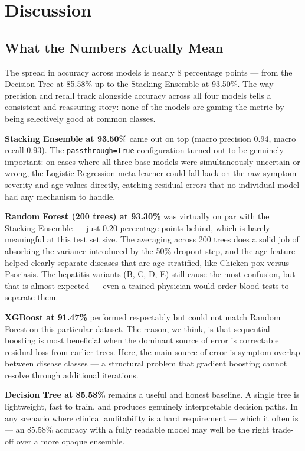 \documentclass[12pt,a4paper]{article}
\begin{document}
\section{Discussion}
\label{sec:discussion}

\subsection{What the Numbers Actually Mean}

The spread in accuracy across models is nearly 8 percentage points --- from the Decision Tree at 85.58\% up to the Stacking Ensemble at 93.50\%. The way precision and recall track alongside accuracy across all four models tells a consistent and reassuring story: none of the models are gaming the metric by being selectively good at common classes.

\textbf{Stacking Ensemble at 93.50\%} came out on top (macro precision 0.94, macro recall 0.93). The \texttt{passthrough=True} configuration turned out to be genuinely important: on cases where all three base models were simultaneously uncertain or wrong, the Logistic Regression meta-learner could fall back on the raw symptom severity and age values directly, catching residual errors that no individual model had any mechanism to handle.

\textbf{Random Forest (200 trees) at 93.30\%} was virtually on par with the Stacking Ensemble --- just 0.20 percentage points behind, which is barely meaningful at this test set size. The averaging across 200 trees does a solid job of absorbing the variance introduced by the 50\% dropout step, and the age feature helped clearly separate diseases that are age-stratified, like Chicken pox versus Psoriasis. The hepatitis variants (B, C, D, E) still cause the most confusion, but that is almost expected --- even a trained physician would order blood tests to separate them.

\textbf{XGBoost at 91.47\%} performed respectably but could not match Random Forest on this particular dataset. The reason, we think, is that sequential boosting is most beneficial when the dominant source of error is correctable residual loss from earlier trees. Here, the main source of error is symptom overlap between disease classes --- a structural problem that gradient boosting cannot resolve through additional iterations.

\textbf{Decision Tree at 85.58\%} remains a useful and honest baseline. A single tree is lightweight, fast to train, and produces genuinely interpretable decision paths. In any scenario where clinical auditability is a hard requirement --- which it often is --- an 85.58\% accuracy with a fully readable model may well be the right trade-off over a more opaque ensemble.
\end{document}
